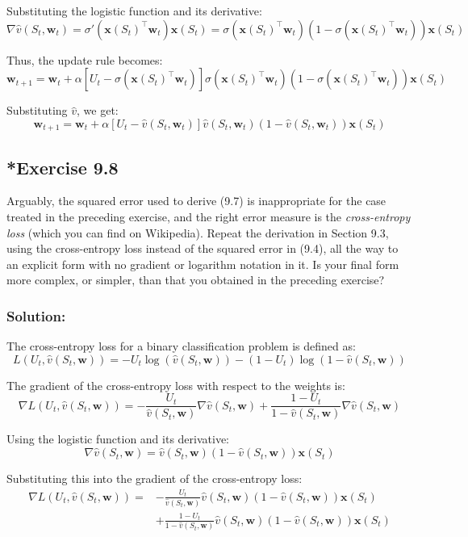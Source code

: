Substituting the logistic function and its derivative:
\[
    \nabla \hat{v}(S_t, \mathbf{w}_t) = \sigma'(\mathbf{x}(S_t)^\top \mathbf{w}_t) \mathbf{x}(S_t) = \sigma(\mathbf{x}(S_t)^\top \mathbf{w}_t) (1 - \sigma(\mathbf{x}(S_t)^\top \mathbf{w}_t)) \mathbf{x}(S_t)
\]

Thus, the update rule becomes:
\[
    \mathbf{w}_{t+1} = \mathbf{w}_t + \alpha \left[ U_t - \sigma(\mathbf{x}(S_t)^\top \mathbf{w}_t) \right] \sigma(\mathbf{x}(S_t)^\top \mathbf{w}_t) (1 - \sigma(\mathbf{x}(S_t)^\top \mathbf{w}_t)) \mathbf{x}(S_t)
\]

Substituting $\hat{v}$, we get:
\[
    \mathbf{w}_{t+1} = \mathbf{w}_t + \alpha \left[ U_t - \hat{v}(S_t, \mathbf{w}_t) \right] \hat{v}(S_t, \mathbf{w}_t) (1 - \hat{v}(S_t, \mathbf{w}_t)) \mathbf{x}(S_t)
\]


\subsection*{*Exercise 9.8}
Arguably, the squared error used to derive (9.7) is inappropriate for the
case treated in the preceding exercise, and the right error measure is the \textit{cross-entropy
loss} (which you can find on Wikipedia). Repeat the derivation in Section 9.3, using the
cross-entropy loss instead of the squared error in (9.4), all the way to an explicit form
with no gradient or logarithm notation in it. Is your final form more complex, or simpler,
than that you obtained in the preceding exercise?

\subsubsection*{Solution:}

The cross-entropy loss for a binary classification problem is defined as:
\[ 
    L(U_t, \hat{v}(S_t, \mathbf{w})) = - U_t \log(\hat{v}(S_t, \mathbf{w})) - (1 - U_t) \log(1 - \hat{v}(S_t, \mathbf{w}))
\]

The gradient of the cross-entropy loss with respect to the weights is:
\[ 
    \nabla L(U_t, \hat{v}(S_t, \mathbf{w})) = - \frac{U_t}{\hat{v}(S_t, \mathbf{w})} \nabla \hat{v}(S_t, \mathbf{w}) + \frac{1 - U_t}{1 - \hat{v}(S_t, \mathbf{w})} \nabla \hat{v}(S_t, \mathbf{w})
\]

Using the logistic function and its derivative:
\[ 
    \nabla \hat{v}(S_t, \mathbf{w}) = \hat{v}(S_t, \mathbf{w}) (1 - \hat{v}(S_t, \mathbf{w})) \mathbf{x}(S_t)
\]

Substituting this into the gradient of the cross-entropy loss:
\begin{align*} 
    \nabla L(U_t, \hat{v}(S_t, \mathbf{w})) = &- \frac{U_t}{\hat{v}(S_t, \mathbf{w})} \hat{v}(S_t, \mathbf{w}) (1 - \hat{v}(S_t, \mathbf{w})) \mathbf{x}(S_t) \\
    &+ \frac{1 - U_t}{1 - \hat{v}(S_t, \mathbf{w})} \hat{v}(S_t, \mathbf{w}) (1 - \hat{v}(S_t, \mathbf{w})) \mathbf{x}(S_t)
\end{align*}

